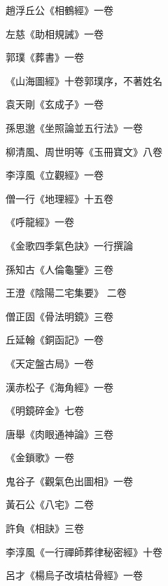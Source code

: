 \begin{pinyinscope}
 趙浮丘公《相鶴經》一卷



 左慈《助相規誡》一卷



 郭璞《葬書》一卷



 《山海圖經》十卷郭璞序，不著姓名



 袁天剛《玄成子》一卷



 孫思邈《坐照論並五行法》一卷



 柳清風、周世明等《玉冊寶文》八卷



 李淳風《立觀經》一卷



 僧一行《地理經》十五卷



 《呼龍經》一卷



 《金歌四季氣色訣》一行撰論



 孫知古《人倫龜鑒》三卷



 王澄《陰陽二宅集要》
 二卷



 僧正固《骨法明鏡》三卷



 丘延翰《銅函記》一卷



 《天定盤古局》一卷



 漢赤松子《海角經》一卷



 《明鏡碎金》七卷



 唐舉《肉眼通神論》三卷



 《金鎖歌》一卷



 鬼谷子《觀氣色出圖相》一卷



 黃石公《八宅》二卷



 許負《相訣》三卷



 李淳風《一行禪師葬律秘密經》十卷



 呂才《楊烏子改墳枯骨經》一卷




\end{pinyinscope}
